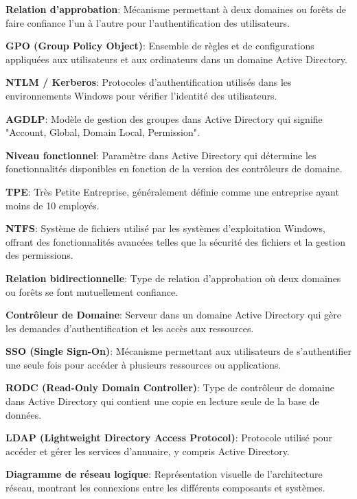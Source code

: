 \noindent \textbf{Relation d'approbation}:
Mécanisme permettant à deux domaines ou forêts de faire confiance l'un à l'autre pour l'authentification des utilisateurs.

\noindent \textbf{GPO (Group Policy Object)}:
Ensemble de règles et de configurations appliquées aux utilisateurs et aux ordinateurs dans un domaine Active Directory.

\noindent \textbf{NTLM / Kerberos}:
Protocoles d'authentification utilisés dans les environnements Windows pour vérifier l'identité des utilisateurs.

\noindent \textbf{AGDLP}:
Modèle de gestion des groupes dans Active Directory qui signifie "Account, Global, Domain Local, Permission".

\noindent \textbf{Niveau fonctionnel}:
Paramètre dans Active Directory qui détermine les fonctionnalités disponibles en fonction de la version des contrôleurs de domaine.

\noindent \textbf{TPE}:
Très Petite Entreprise, généralement définie comme une entreprise ayant moins de 10 employés.

\noindent \textbf{NTFS}:
Système de fichiers utilisé par les systèmes d'exploitation Windows, offrant des fonctionnalités avancées telles que la sécurité des fichiers et la gestion des permissions.

\noindent \textbf{Relation bidirectionnelle}:
Type de relation d'approbation où deux domaines ou forêts se font mutuellement confiance.

\noindent \textbf{Contrôleur de Domaine}:
Serveur dans un domaine Active Directory qui gère les demandes d'authentification et les accès aux ressources.

\noindent \textbf{SSO (Single Sign-On)}:
Mécanisme permettant aux utilisateurs de s'authentifier une seule fois pour accéder à plusieurs ressources ou applications.

\noindent \textbf{RODC (Read-Only Domain Controller)}:
Type de contrôleur de domaine dans Active Directory qui contient une copie en lecture seule de la base de données.

\noindent \textbf{LDAP (Lightweight Directory Access Protocol)}:
Protocole utilisé pour accéder et gérer les services d'annuaire, y compris Active Directory.

\noindent \textbf{Diagramme de réseau logique}:
Représentation visuelle de l'architecture réseau, montrant les connexions entre les différents composants et systèmes.

\vspace{0.5cm}

